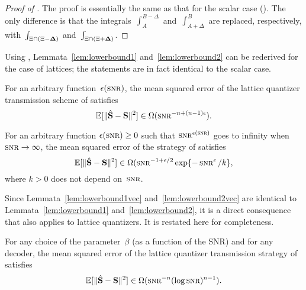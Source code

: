 \begin{proof}[Proof of ]
  The proof is essentially the same as that for the scalar case
  (). The only difference is that the
  integrals~$\int_A^{B-\Delta}$ and~$\int_{A+\Delta}^B$ are replaced,
  respectively, with~$\int_{\Xi \cap (\Xi - \mathbf{\Delta})}$ and~$\int_{\Xi \cap (\Xi +
  \mathbf{\Delta})}$.
\end{proof}

Using , Lemmata~\ref{lem:lowerbound1}
and~\ref{lem:lowerbound2} can be rederived for the case of lattices; the
statements are in fact identical to the scalar case.

\begin{lemma}
  \label{lem:lowerbound1vec}
  For an arbitrary function~$\e(\snr)$, the mean squared error of the lattice
  quantizer transmission scheme of  satisfies
  \begin{equation*}
    \msev \in \Omega(\snr^{-n + (n-1)\e}).
  \end{equation*}
\end{lemma}

\begin{lemma}
  \label{lem:lowerbound2vec}
  For an arbitrary function $\e(\snr) \ge 0$ such that 
  $\snr^{\e(\snr)}$ goes to infinity when $\snr \goesto \infty$, the mean
  squared error of the strategy of  satisfies
  \begin{equation*}
    \msev \in \Omega(\snr^{-1 + \e/2} \exp\{- \snr^\e/k \},
  \end{equation*}
  where $k > 0$ does not depend on~$\snr$.
\end{lemma}

Since Lemmata~\ref{lem:lowerbound1vec} and~\ref{lem:lowerbound2vec} are
identical to Lemmata~\ref{lem:lowerbound1} and~\ref{lem:lowerbound2}, it is a
direct consequence that  also applies to lattice quantizers.
It is restated here for completeness.

\begin{theorem}
  \label{thm:scalinglbvec}
  For any choice of the parameter~$\beta$ (as a function of the SNR) and for any
  decoder, the mean squared error of the lattice quantizer transmission strategy
  of  satisfies
  \begin{equation*}
    \msev \in \Omega(\snr^{-n} (\log\snr)^{n-1}).
  \end{equation*}
\end{theorem}

